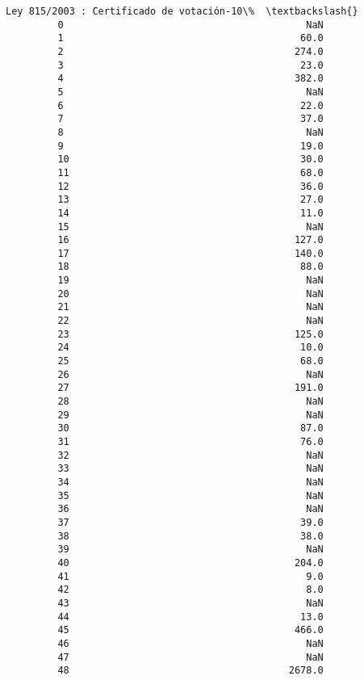 \documentclass[11pt]{article}
\begin{document}
\begin{Verbatim}[commandchars=\\\{\}]
             Ley 815/2003 : Certificado de votación-10\%  \textbackslash{}
         0                                          NaN   
         1                                         60.0   
         2                                        274.0   
         3                                         23.0   
         4                                        382.0   
         5                                          NaN   
         6                                         22.0   
         7                                         37.0   
         8                                          NaN   
         9                                         19.0   
         10                                        30.0   
         11                                        68.0   
         12                                        36.0   
         13                                        27.0   
         14                                        11.0   
         15                                         NaN   
         16                                       127.0   
         17                                       140.0   
         18                                        88.0   
         19                                         NaN   
         20                                         NaN   
         21                                         NaN   
         22                                         NaN   
         23                                       125.0   
         24                                        10.0   
         25                                        68.0   
         26                                         NaN   
         27                                       191.0   
         28                                         NaN   
         29                                         NaN   
         30                                        87.0   
         31                                        76.0   
         32                                         NaN   
         33                                         NaN   
         34                                         NaN   
         35                                         NaN   
         36                                         NaN   
         37                                        39.0   
         38                                        38.0   
         39                                         NaN   
         40                                       204.0   
         41                                         9.0   
         42                                         8.0   
         43                                         NaN   
         44                                        13.0   
         45                                       466.0   
         46                                         NaN   
         47                                         NaN   
         48                                      2678.0   
         

\end{Verbatim}
\end{document}
